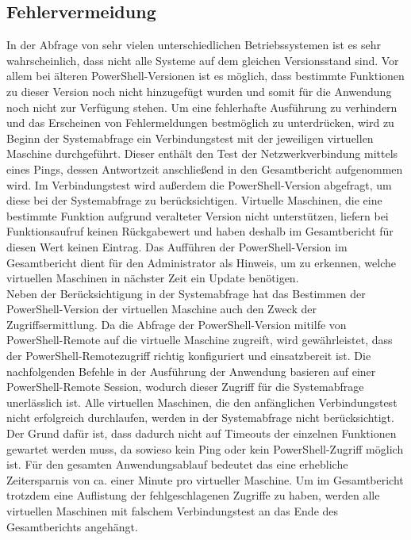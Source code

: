 \subsection{Fehlervermeidung}\label{sec:Fehler}
In der Abfrage von sehr vielen unterschiedlichen Betriebssystemen ist es sehr wahrscheinlich, dass nicht alle Systeme auf dem gleichen Versionsstand sind. Vor allem bei älteren PowerShell-Versionen ist es möglich, dass bestimmte Funktionen zu dieser Version noch nicht hinzugefügt wurden und somit für die Anwendung noch nicht zur Verfügung stehen. Um eine fehlerhafte Ausführung zu verhindern und das Erscheinen von Fehlermeldungen bestmöglich zu unterdrücken, wird zu Beginn der Systemabfrage ein Verbindungstest mit der jeweiligen virtuellen Maschine durchgeführt. Dieser enthält den Test der Netzwerkverbindung mittels eines Pings, dessen Antwortzeit anschließend in den Gesamtbericht aufgenommen wird. Im Verbindungstest wird außerdem die PowerShell-Version abgefragt, um diese bei der Systemabfrage zu berücksichtigen. Virtuelle Maschinen, die eine bestimmte Funktion aufgrund veralteter Version nicht unterstützen, liefern bei Funktionsaufruf keinen Rückgabewert und haben deshalb im Gesamtbericht für diesen Wert keinen Eintrag. Das Aufführen der PowerShell-Version im Gesamtbericht dient für den Administrator als Hinweis, um zu erkennen, welche virtuellen Maschinen in nächster Zeit ein Update benötigen.\medskip\\Neben der Berücksichtigung in der Systemabfrage hat das Bestimmen der PowerShell-Version der virtuellen Maschine auch den Zweck der Zugriffsermittlung. Da die Abfrage der PowerShell-Version mitilfe von PowerShell-Remote auf die virtuelle Maschine zugreift, wird gewährleistet, dass der PowerShell-Remotezugriff richtig konfiguriert und einsatzbereit ist. Die nachfolgenden Befehle in der Ausführung der Anwendung basieren auf einer PowerShell-Remote Session, wodurch dieser Zugriff für die Systemabfrage unerlässlich ist. 
Alle virtuellen Maschinen, die den anfänglichen Verbindungstest nicht erfolgreich durchlaufen, werden in der Systemabfrage nicht berücksichtigt. Der Grund dafür ist, dass dadurch nicht auf Timeouts der einzelnen Funktionen gewartet werden muss, da sowieso kein Ping oder kein PowerShell-Zugriff möglich ist. Für den gesamten Anwendungsablauf bedeutet das eine erhebliche Zeitersparnis von ca. einer Minute pro virtueller Maschine. Um im Gesamtbericht trotzdem eine Auflistung der fehlgeschlagenen Zugriffe zu haben, werden alle virtuellen Maschinen mit falschem Verbindungstest an das Ende des Gesamtberichts angehängt.
